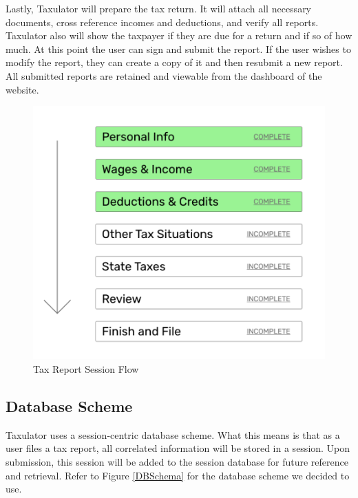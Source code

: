 \documentclass[sigconf]{acmart}
\begin{document}
Lastly, Taxulator will prepare the tax return. It will attach all necessary documents, cross reference incomes and deductions, and verify all reports. Taxulator also will show the taxpayer if they are due for a return and if so of how much. At this point the user can sign and submit the report.
If the user wishes to modify the report, they can create a copy of it and then resubmit a new report. All submitted reports are retained and viewable from the dashboard of the website.

\begin{figure}[H]
  \label{UserFlow}
  \centering
  \includegraphics[width=\linewidth]{Images/UserFlow.png}
  \caption{Tax Report Session Flow}
\end{figure}

\subsection{Database Scheme}
Taxulator uses a session-centric database scheme. What this means is that as a user files a tax report, all correlated information will be stored in a session. Upon submission, this session will be added to the session database for future reference and retrieval. Refer to Figure \ref{DBSchema} for the database scheme we decided to use.
\end{document}

